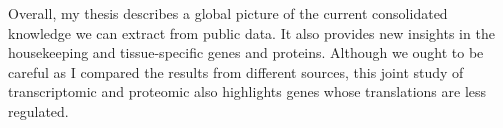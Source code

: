 \begin{singlespace}
{    Overall, my thesis describes a global picture of the current consolidated
    knowledge we can extract from public data. It also provides new insights
    in the housekeeping and tissue-specific genes and proteins. Although we
    ought to be careful as I compared the results from different sources,
    this joint study of transcriptomic and proteomic also highlights genes
    whose translations are less regulated.
    } 
\end{singlespace}
